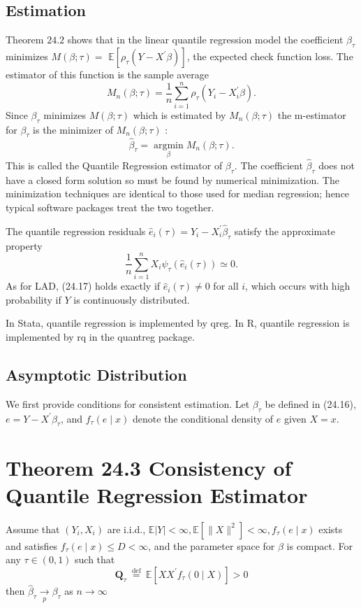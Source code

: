 \documentclass[10pt]{article}
\begin{document}
\subsection{Estimation}
Theorem $24.2$ shows that in the linear quantile regression model the coefficient $\beta_{\tau}$ minimizes $M(\beta ; \tau)=$ $\mathbb{E}\left[\rho_{\tau}\left(Y-X^{\prime} \beta\right)\right]$, the expected check function loss. The estimator of this function is the sample average
$$
M_{n}(\beta ; \tau)=\frac{1}{n} \sum_{i=1}^{n} \rho_{\tau}\left(Y_{i}-X_{i}^{\prime} \beta\right) .
$$
Since $\beta_{\tau}$ minimizes $M(\beta ; \tau)$ which is estimated by $M_{n}(\beta ; \tau)$ the m-estimator for $\beta_{\tau}$ is the minimizer of $M_{n}(\beta ; \tau)$ :
$$
\widehat{\beta}_{\tau}=\underset{\beta}{\operatorname{argmin}} M_{n}(\beta ; \tau) .
$$
This is called the Quantile Regression estimator of $\beta_{\tau}$. The coefficient $\widehat{\beta}_{\tau}$ does not have a closed form solution so must be found by numerical minimization. The minimization techniques are identical to those used for median regression; hence typical software packages treat the two together.

The quantile regression residuals $\widehat{e}_{i}(\tau)=Y_{i}-X_{i}^{\prime} \widehat{\beta}_{\tau}$ satisfy the approximate property
$$
\frac{1}{n} \sum_{i=1}^{n} X_{i} \psi_{\tau}\left(\widehat{e}_{i}(\tau)\right) \simeq 0 .
$$
As for LAD, (24.17) holds exactly if $\widehat{e}_{i}(\tau) \neq 0$ for all $i$, which occurs with high probability if $Y$ is continuously distributed.

In Stata, quantile regression is implemented by qreg. In R, quantile regression is implemented by $\mathrm{rq}$ in the quantreg package.

\subsection{Asymptotic Distribution}
We first provide conditions for consistent estimation. Let $\beta_{\tau}$ be defined in (24.16), $e=Y-X^{\prime} \beta_{\tau}$, and $f_{\tau}(e \mid x)$ denote the conditional density of $e$ given $X=x$.

\section{Theorem 24.3 Consistency of Quantile Regression Estimator}
Assume that $\left(Y_{i}, X_{i}\right)$ are i.i.d., $\mathbb{E}|Y|<\infty, \mathbb{E}\left[\|X\|^{2}\right]<\infty, f_{\tau}(e \mid x)$ exists and satisfies $f_{\tau}(e \mid x) \leq D<\infty$, and the parameter space for $\beta$ is compact. For any $\tau \in(0,1)$ such that
$$
\boldsymbol{Q}_{\tau} \stackrel{\text { def }}{=} \mathbb{E}\left[X X^{\prime} f_{\tau}(0 \mid X)\right]>0
$$
then $\widehat{\beta}_{\tau} \underset{p}{\rightarrow} \beta_{\tau}$ as $n \rightarrow \infty$
\end{document}
